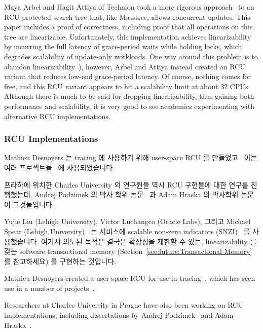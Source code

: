 Maya Arbel and Hagit Attiya of Technion took a more rigorous
approach~\cite{MayaArbel2014RCUtree} to an RCU-protected search tree that,
like Masstree, allows concurrent updates.
This paper includes a proof of correctness, including proof that all
operations on this tree are linearizable.
Unfortunately, this implementation achieves linearizability by incurring
the full latency of grace-period waits while holding locks, which degrades
scalability of update-only workloads.
One way around this problem is to abandon
linearizability~\cite{AndreasHaas2012FIFOisnt,PaulEMcKennneyAtomicTreeN4037}),
however, Arbel and Attiya instead created an RCU variant that reduces
low-end grace-period latency.
Of course, nothing comes for free, and this RCU variant appears to hit
a scalability limit at about 32 CPUs.
Although there is much to be said for dropping linearizability, thus
gaining both performance and scalability, it is very good to see academics
experimenting with alternative RCU implementations.
\fi

\subsubsection{RCU Implementations}
\label{sec:defer:RCU Implementations}

Mathieu Desnoyers 는 tracing 에 사용하기 위해 user-space RCU 를
만들었고~\cite{MathieuDesnoyers2009URCU,MathieuDesnoyersPhD,MathieuDesnoyers2012URCU}
이는 여러 프로젝트들~\cite{MikeDay2013RCUqemu} 에 사용되었습니다.

프라하에 위치한 Charles University 의 연구원들 역시 RCU 구현들에 대한 연구를
진행했는데, Andrej Podzimek 의 박사 학위 논문~\cite{AndreasHaas2012FIFOisnt} 과
Adam Hraska 의 박사학위 논문~\cite{AdamHraska2013RCUHelenOS} 이 그것들입니다.

Yujie Liu (Lehigh University), Victor Luchangco (Oracle Labs), 그리고
Michael Spear (Lehigh University)~\cite{Liu:2013:MSA:2549695.2549732} 는
서비스에 scalable non-zero indicators (SNZI)~\cite{FaithEllen:2007:SNZI} 를
사용했습니다.
여기서 의도된 목적은 결국은 확장성을 제한할 수 있는, linearizability 를 갖는
software transactional memory
(Section~\ref{sec:future:Transactional Memory} 를 참고하세요) 를 구현하는
것입니다.
\iffalse

Mathieu Desnoyers created a user-space RCU for use in
tracing~\cite{MathieuDesnoyers2009URCU,MathieuDesnoyersPhD,MathieuDesnoyers2012URCU},
which has seen use in a number of projects~\cite{MikeDay2013RCUqemu}.

Researchers at Charles University in Prague have also been
working on RCU implementations, including dissertations by
Andrej Podzimek~\cite{AndrejPodzimek2010masters} and Adam
Hraska~\cite{AdamHraska2013RCUHelenOS}.

